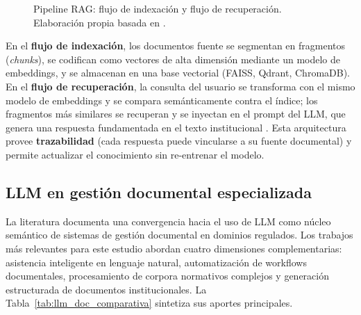 \begin{figure}[H]
\caption{Pipeline RAG: flujo de indexación y flujo de recuperación. Elaboración propia basada en \citet{farsane2025automatizacion}.}
\label{fig:rag_pipeline}
\end{figure}

En el \textbf{flujo de indexación}, los documentos fuente se segmentan en fragmentos (\textit{chunks}), se codifican como vectores de alta dimensión mediante un modelo de embeddings, y se almacenan en una base vectorial (FAISS, Qdrant, ChromaDB). En el \textbf{flujo de recuperación}, la consulta del usuario se transforma con el mismo modelo de embeddings y se compara semánticamente contra el índice; los fragmentos más similares se recuperan y se inyectan en el prompt del LLM, que genera una respuesta fundamentada en el texto institucional \citep{farsane2025automatizacion}. Esta arquitectura provee \textbf{trazabilidad} (cada respuesta puede vincularse a su fuente documental) y permite actualizar el conocimiento sin re-entrenar el modelo.

\subsection{LLM en gestión documental especializada}

La literatura documenta una convergencia hacia el uso de LLM como núcleo semántico de sistemas de gestión documental en dominios regulados. Los trabajos más relevantes para este estudio abordan cuatro dimensiones complementarias: asistencia inteligente en lenguaje natural, automatización de workflows documentales, procesamiento de corpora normativos complejos y generación estructurada de documentos institucionales. La Tabla~\ref{tab:llm_doc_comparativa} sintetiza sus aportes principales.

